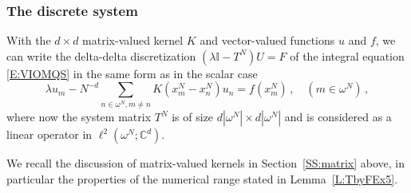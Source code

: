 \documentclass[12pt]{amsart}
\theoremstyle{definition}
\theoremstyle{remark}
\numberwithin{equation}{section}
\newcommand\C{{\mathbb C}}
\newcommand {\Id}{\mathbb I}
\begin{document}
\subsubsection{The discrete system}\label{SS:DA2dEx5}
With the $d\times d$ matrix-valued kernel $K$ and vector-valued functions $u$ and $f$, we can write the delta-delta discretization $(\lambda\Id - T^{N})U=F$ of the integral equation \eqref{E:VIOMQS} in the same form as in the scalar case
\begin{equation}
\label{E:DDAEx5}
 \lambda u_{m} - N^{-d}\!\!\!\!\sum_{n\in\omega^{N},m\ne n}K(x^{N}_{m}-x^{N}_{n})u_{n}= f(x^{N}_{m}) \,,\quad (m\in\omega^{N})\,,
\end{equation}
where now the system matrix $T^{N}$ is of size $d|\omega^{N}|\times d|\omega^{N}|$ and is considered as a linear operator in $\ell^{2}(\omega^{N};\C^{d})$.

We recall the discussion of matrix-valued kernels in Section~\ref{SS:matrix} above, in particular the properties of the numerical range stated in Lemma~\ref{L:TbyFEx5}.
\end{document}
